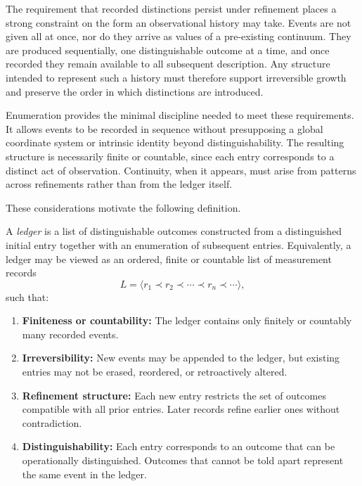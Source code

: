The requirement that recorded distinctions persist under refinement places a
strong constraint on the form an observational history may take. Events are not
given all at once, nor do they arrive as values of a pre-existing continuum.
They are produced sequentially, one distinguishable outcome at a time, and once
recorded they remain available to all subsequent description. Any structure
intended to represent such a history must therefore support irreversible growth
and preserve the order in which distinctions are introduced.

Enumeration provides the minimal discipline needed to meet these requirements.
It allows events to be recorded in sequence without presupposing a global
coordinate system or intrinsic identity beyond distinguishability. The resulting
structure is necessarily finite or countable, since each entry corresponds to a
distinct act of observation. Continuity, when it appears, must arise from
patterns across refinements rather than from the ledger itself.

These considerations motivate the following definition.

\begin{definition}[Ledger]
\label{def:ledger}
A \emph{ledger} is a list of distinguishable outcomes constructed from a
distinguished initial entry together with an enumeration of subsequent entries.
Equivalently, a ledger may be viewed as an ordered, finite or countable list of
measurement records
\[
  L = \langle r_1 \prec r_2 \prec \cdots \prec r_n \prec \cdots \rangle,
\]
such that:
\begin{enumerate}
\item \textbf{Finiteness or countability:}
      The ledger contains only finitely or countably many recorded events.

\item \textbf{Irreversibility:}
      New events may be appended to the ledger, but existing entries may not be
      erased, reordered, or retroactively altered.

\item \textbf{Refinement structure:}
      Each new entry restricts the set of outcomes compatible with all prior
      entries. Later records refine earlier ones without contradiction.

\item \textbf{Distinguishability:}
      Each entry corresponds to an outcome that can be operationally
      distinguished. Outcomes that cannot be told apart represent the same
      event in the ledger.
\end{enumerate}
\end{definition}


